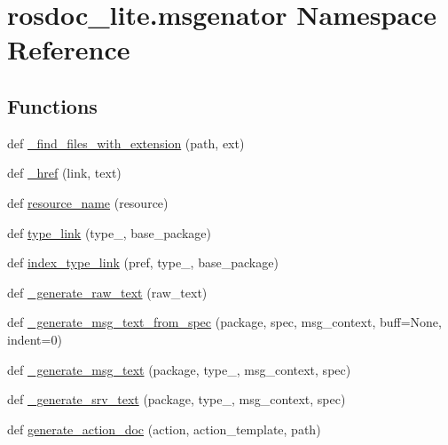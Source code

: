 \hypertarget{namespacerosdoc__lite_1_1msgenator}{}\section{rosdoc\+\_\+lite.\+msgenator Namespace Reference}
\label{namespacerosdoc__lite_1_1msgenator}
\subsection*{Functions}
\begin{DoxyCompactItemize}
\item 
def \hyperlink{namespacerosdoc__lite_1_1msgenator_a10e63ab0384c19aa19716060f76cefe5}{\+\_\+find\+\_\+files\+\_\+with\+\_\+extension} (path, ext)
\item 
def \hyperlink{namespacerosdoc__lite_1_1msgenator_ac9cd8a4704d84282af9ee48f0b8a3eb9}{\+\_\+href} (link, text)
\item 
def \hyperlink{namespacerosdoc__lite_1_1msgenator_aef4a9b8ec5bad3fbfc49e6f60aec263d}{resource\+\_\+name} (resource)
\item 
def \hyperlink{namespacerosdoc__lite_1_1msgenator_ae7b2ebaabcca635cf4572218382dda21}{type\+\_\+link} (type\+\_\+, base\+\_\+package)
\item 
def \hyperlink{namespacerosdoc__lite_1_1msgenator_a76e26f25f411e13fa62bc911ffbe7fbe}{index\+\_\+type\+\_\+link} (pref, type\+\_\+, base\+\_\+package)
\item 
def \hyperlink{namespacerosdoc__lite_1_1msgenator_a4736a1112a1d51b46005be9af38f91a5}{\+\_\+generate\+\_\+raw\+\_\+text} (raw\+\_\+text)
\item 
def \hyperlink{namespacerosdoc__lite_1_1msgenator_ae10b8c65520e15517f506220db1d916e}{\+\_\+generate\+\_\+msg\+\_\+text\+\_\+from\+\_\+spec} (package, spec, msg\+\_\+context, buff=None, indent=0)
\item 
def \hyperlink{namespacerosdoc__lite_1_1msgenator_a2dffbb93d16e371623e82b6ce7f46250}{\+\_\+generate\+\_\+msg\+\_\+text} (package, type\+\_\+, msg\+\_\+context, spec)
\item 
def \hyperlink{namespacerosdoc__lite_1_1msgenator_a58a393209078d47525c3e29cbbda901d}{\+\_\+generate\+\_\+srv\+\_\+text} (package, type\+\_\+, msg\+\_\+context, spec)
\item 
def \hyperlink{namespacerosdoc__lite_1_1msgenator_af6701c159861799487da66dc92db3540}{generate\+\_\+action\+\_\+doc} (action, action\+\_\+template, path)
\item 

\end{DoxyCompactItemize}

